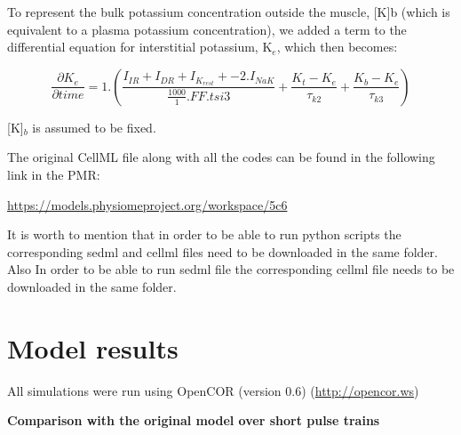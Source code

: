 \documentclass[fleqn,10pt]{physiome}
\begin{document}
To represent the bulk potassium concentration outside the muscle, [K]b (which is equivalent to a plasma potassium concentration), we added a term to the differential equation for interstitial potassium, K$_e$, which then becomes:

\begin{equation}
    \frac{\partial K_e}{\partial time} = 1. (\frac{I_{IR}+I_{DR}+I_{K}_{rest}+ - 2.I_{NaK}}{\frac{1000}{1}.FF.tsi3}+\frac{K_t-K_e}{\tau_{k2}}+\frac{K_b-K_e}{\tau_{k3}})
\end{equation}

[K]$_b$ is assumed to be fixed.\newline

The original CellML file along with all the codes can be found in the following link in the PMR:\newline

\url{https://models.physiomeproject.org/workspace/5c6}

It is worth to mention that in order to be able to run python scripts the corresponding sedml and cellml files need to be downloaded in the same folder. Also In order to be able to run sedml file the corresponding cellml file needs to be downloaded in the same folder.


\section{Model results}

All simulations were run using OpenCOR (version 0.6) \citep{garny2015opencor}\newline(\url{http://opencor.ws})\newline

\textbf{Comparison with the original model over short pulse trains}\newline
\end{document}

